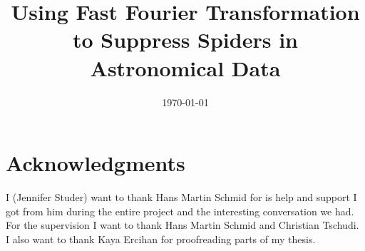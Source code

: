 \documentclass[a4paper,10pt,oneside, fleqn]{article}
\title{Using Fast Fourier Transformation to Suppress Spiders in Astronomical Data}
\date{\today}
\begin{document}
\maketitle

\pagestyle{fancy}               	%

\vspace*{\fill}
\begin{abstract}

\end{abstract}
\vspace*{\fill}
\newpage

\tableofcontents
\newpage







%


\section{Acknowledgments}
I (Jennifer Studer) want to thank Hans Martin Schmid for is help and support I got from him during the entire project and the interesting conversation we had. For the supervision I want to thank Hans Martin Schmid and Christian Tschudi. I also want to thank Kaya Ercihan for proofreading parts of my thesis. 

\newpage 

\appendix


\newpage


\end{document}
